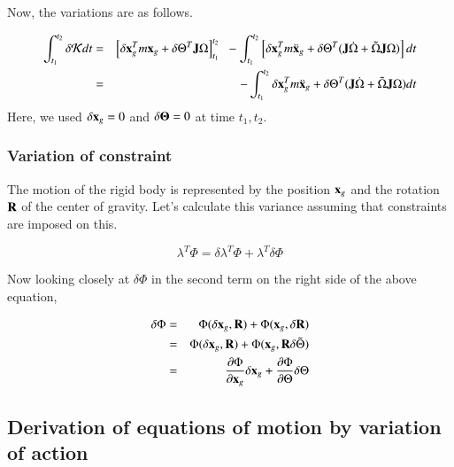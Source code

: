Now, the variations are as follows.

\begin{eqnarray}
\int_{t_1}^{t_2}\delta{\cal K}dt
&=& \left[\delta \mathbf{x}_g^T m \mathbf{x}_g + \delta\Theta^T \mathbf{J}\Omega\right]_{t_1}^{t_2}\;\; - \int_{t_1}^{t_2}\left[\delta\mathbf{x}_g^T m\ddot{\mathbf{x}}_g  + \delta\Theta^T(\mathbf{J}\dot{\Omega}+\tilde{\Omega}\mathbf{J}\Omega)\right]dt\\
&=& - \int_{t_1}^{t_2}\delta\mathbf{x}_g^T m\ddot{\mathbf{x}}_g  + \delta\Theta^T(\mathbf{J}\dot{\Omega}+\tilde{\Omega}\mathbf{J}\Omega)dt
\end{eqnarray}
%
Here, we used $\delta\mathbf{x}_g = 0$ and $\delta\mathbf{\Theta} = 0$ at time $t_1,t_2$.

\subsubsection{Variation of constraint}

The motion of the rigid body is represented by the position $\mathbf{x}_g$ and the rotation $\mathbf{R}$ of the center of gravity. Let's calculate this variance assuming that constraints are imposed on this.

\begin{equation}
\lambda^T \Phi = \delta\lambda^T\Phi +\lambda^T\delta\Phi
\end{equation}

Now looking closely at $\delta\Phi$ in the second term on the right side of the above equation,

\begin{eqnarray}
\delta\Phi
&=&  \Phi(\delta\mathbf{x}_g,\mathbf{R}) + \Phi(\mathbf{x}_g,\delta{\mathbf{R}})\\
&=& \Phi(\delta\mathbf{x}_g,\mathbf{R}) + \Phi(\mathbf{x}_g,\mathbf{R}\delta\tilde{\Theta})\\
&=& \frac{\partial \Phi}{\partial \mathbf{x}_g}\delta\mathbf{x}_g + \frac{\partial\Phi}{\partial\Theta}\delta\Theta
\end{eqnarray}


\subsection{Derivation of equations of motion by variation of action}

